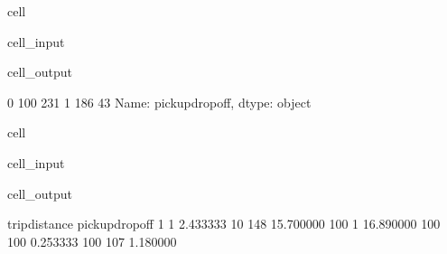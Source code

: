 \documentclass[letterpaper,10pt,english]{sphinxmanual}
\begin{document}
\begin{sphinxuseclass}{cell}
\begin{sphinxuseclass}{cell_input}
\begin{sphinxVerbatim}[commandchars=\\\{\}]
\PYG{p}{[}\PYG{p}{]}  \PYG{p}{[}\PYG{p}{]}    \PYG{p}{[}\PYG{p}{]}
\PYG{p}{[}\PYG{p}{]}
\end{sphinxVerbatim}

\end{sphinxuseclass}
\begin{sphinxuseclass}{cell_output}
\begin{sphinxVerbatim}[commandchars=\\\{\}]
0    100 231
1     186 43
Name: pickup\PYGZus{}dropoff, dtype: object
\end{sphinxVerbatim}

\end{sphinxuseclass}
\end{sphinxuseclass}
\begin{sphinxuseclass}{cell}
\begin{sphinxuseclass}{cell_input}
\begin{sphinxVerbatim}[commandchars=\\\{\}]
  \PYG{p}{[}\PYG{p}{[}\PYG{p}{]}\PYG{p}{]}
\PYG{p}{[}\PYG{p}{]}
\end{sphinxVerbatim}

\end{sphinxuseclass}
\begin{sphinxuseclass}{cell_output}
\begin{sphinxVerbatim}[commandchars=\\\{\}]
                trip\PYGZus{}distance
pickup\PYGZus{}dropoff               
1 1                  2.433333
10 148              15.700000
100 1               16.890000
100 100              0.253333
100 107              1.180000
\end{sphinxVerbatim}

\end{sphinxuseclass}
\end{sphinxuseclass}
\end{document}
